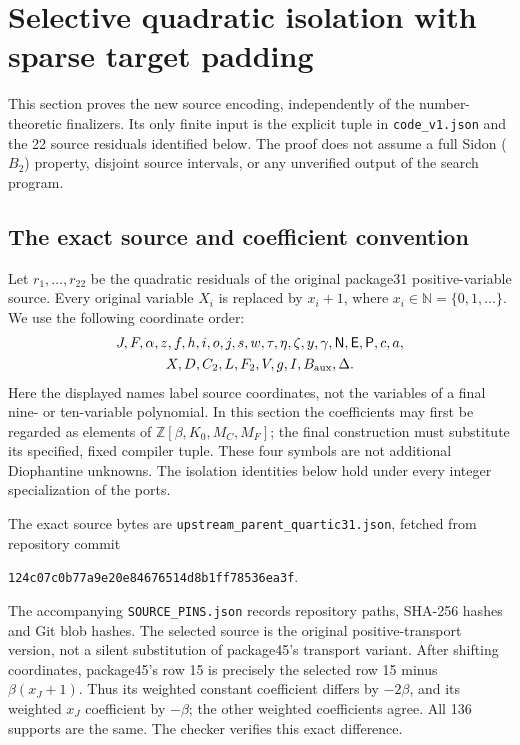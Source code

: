 \section{Selective quadratic isolation with sparse target padding}
\label{sec:selective-isolation}

This section proves the new source encoding, independently of the
number-theoretic finalizers.  Its only finite input is the explicit tuple
in \texttt{code\_v1.json} and the 22 source residuals identified below.
The proof does not assume a full Sidon ($B_2$) property, disjoint source
intervals, or any unverified output of the search program.

\subsection{The exact source and coefficient convention}
Let $r_1,\ldots,r_{22}$ be the quadratic residuals of the original
package31 positive-variable source.  Every original variable $X_i$ is
replaced by $x_i+1$, where $x_i\in\mathbb N=\{0,1,\ldots\}$.
We use the following coordinate order:
\[
\begin{gathered}
J,F,\alpha,z,f,h,i,o,j,s,w,\tau,\eta,\zeta,y,\gamma,\mathsf N,\mathsf E,\mathsf P,c,a,\\
X,D,C_2,L,F_2,V,g,I,B_{\rm aux},\Delta.
\end{gathered}
\]
Here the displayed names label source coordinates, not the variables of a
final nine- or ten-variable polynomial.  In this section the coefficients
may first be regarded as elements of
$\mathbb Z[\beta,K_0,M_C,M_F]$; the final construction must substitute its
specified, fixed compiler tuple.  These four symbols are not additional
Diophantine unknowns.  The isolation identities below hold under every
integer specialization of the ports.

The exact source bytes are \texttt{upstream\_parent\_quartic31.json},
fetched from repository commit
\begin{center}\texttt{124c07c0b77a9e20e84676514d8b1ff78536ea3f}.\end{center}
The accompanying \texttt{SOURCE\_PINS.json} records repository paths,
SHA-256 hashes and Git blob hashes.  The selected source is the original
positive-transport version, not a silent substitution of package45's
transport variant.  After shifting coordinates, package45's row 15 is
precisely the selected row 15 minus $\beta(x_J+1)$.  Thus its weighted
constant coefficient differs by $-2\beta$, and its weighted $x_J$
coefficient by $-\beta$; the other weighted coefficients agree.
All 136 supports are the same.  The checker verifies this exact difference.

